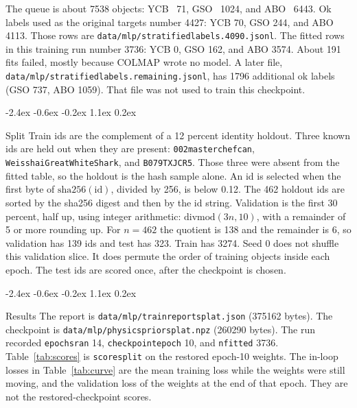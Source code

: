 \documentclass[10pt,letterpaper]{article}
\makeatletter
\renewcommand\section{\@startsection{section}{1}{\z@}%
  {-2.4ex \@plus -0.6ex \@minus -0.2ex}%
  {1.1ex \@plus 0.2ex}%
  {\large\bfseries\raggedright}}
\DeclareRobustCommand{\_}{\textunderscore\allowbreak}
\makeatother
\begin{document}
The queue is about 7538 objects: YCB~\cite{calli2017ycb} 71, GSO~\cite{downs2022gso} 1024, and ABO~\cite{collins2022abo} 6443.
Ok labels used as the original targets number 4427: YCB 70, GSO 244, and ABO 4113.
Those rows are \texttt{data/mlp/stratified\_labels.4090.jsonl}.
The fitted rows in this training run number 3736: YCB 0, GSO 162, and ABO 3574.
About 191 fits failed, mostly because COLMAP wrote no model.
A later file, \texttt{data/mlp/stratified\_labels.remaining.jsonl}, has 1796 additional ok labels (GSO 737, ABO 1059).
That file was not used to train this checkpoint.

\section{Split}
Train ids are the complement of a 12 percent identity holdout.
Three known ids are held out when they are present: \texttt{002\_master\_chef\_can}, \texttt{Weisshai\_Great\_White\_Shark}, and \texttt{B079TXJCR5}.
Those three were absent from the fitted table, so the holdout is the hash sample alone.
An id is selected when the first byte of \(\mathrm{sha256}(\mathrm{id})\), divided by 256, is below 0.12.
The 462 holdout ids are sorted by the sha256 digest and then by the id string.
Validation is the first 30 percent, half up, using integer arithmetic: \(\mathrm{divmod}(3n, 10)\), with a remainder of 5 or more rounding up.
For \(n = 462\) the quotient is 138 and the remainder is 6, so validation has 139 ids and test has 323.
Train has 3274.
Seed 0 does not shuffle this validation slice.
It does permute the order of training objects inside each epoch.
The test ids are scored once, after the checkpoint is chosen.

\section{Results}
\label{sec:results}
The report is \texttt{data/mlp/train\_report\_splat.json} (375162 bytes).
The checkpoint is \texttt{data/mlp/physics\_prior\_splat.npz} (260290 bytes).
The run recorded \texttt{epochs\_ran} 14, \texttt{checkpoint\_epoch} 10, and \texttt{n\_fitted} 3736.
Table~\ref{tab:scores} is \texttt{score\_split} on the restored epoch-10 weights.
The in-loop losses in Table~\ref{tab:curve} are the mean training loss while the weights were still moving, and the validation loss of the weights at the end of that epoch.
They are not the restored-checkpoint scores.
\end{document}

